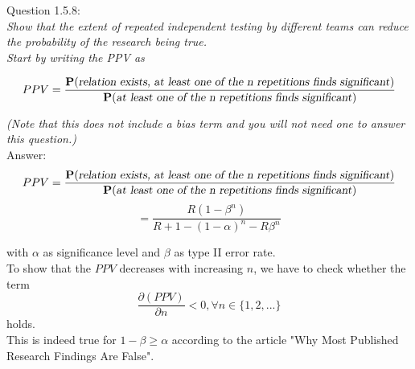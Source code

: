 
Question 1.5.8:\\	
\textsl{ Show that the extent of repeated independent testing by different teams can reduce the probability of the research being true.}\\
	
\textsl{Start by writing the PPV as}

\[ PPV = \frac{\mathbf{P}(\textrm{\textsl{relation exists, at least one of the n repetitions finds significant}})}{\mathbf{P}(\textrm{\textsl{at least one of the n repetitions finds significant}})} \]

\textsl{(Note that this does not include a bias term and you will not need one to answer this question.)}\\

Answer:\\

\[ PPV = \frac{\mathbf{P}(\textrm{\textsl{relation exists, at least one of the n repetitions finds significant}})}{\mathbf{P}(\textrm{\textsl{at least one of the n repetitions finds significant}})}\]
\[	= \frac{R(1-\beta^n)}{R+1-(1-\alpha)^n - R\beta^n} \] 

with $\alpha$ as significance level and $\beta$ as type II error rate.\\

To show that the $PPV$ decreases with increasing $n$, we have to check whether the term \[\frac{\partial(PPV)}{\partial n} < 0, \forall n \in \{1,2,...\} \]
holds.\\

This is indeed true for $1-\beta \ge \alpha$ according to the article "Why Most Published Research Findings Are False".


